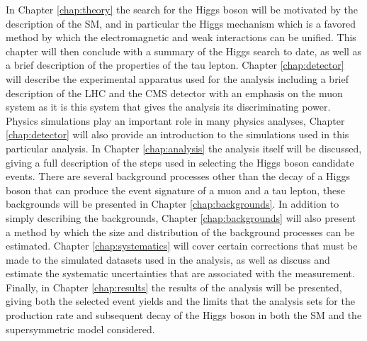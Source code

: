 In Chapter \ref{chap:theory} the search for the Higgs boson will be motivated by the description of the SM, and in particular the Higgs mechanism which is a favored method by which the electromagnetic and weak interactions can be unified.
This chapter will then conclude with a summary of the Higgs search to date, as well as a brief description of the properties of the tau lepton.
Chapter \ref{chap:detector} will describe the experimental apparatus used for the analysis including a brief description of the LHC and the CMS detector with an emphasis on the muon system as it is this system that gives the analysis its discriminating power.
Physics simulations play an important role in many physics analyses, Chapter \ref{chap:detector} will also provide an introduction to the simulations used in this particular analysis.
In Chapter \ref{chap:analysis} the analysis itself will be discussed, giving a full description of the steps used in selecting the Higgs boson candidate events.
There are several background processes other than the decay of a Higgs boson that can produce the event signature of a muon and a tau lepton, these backgrounds will be presented in Chapter \ref{chap:backgrounds}.
In addition to simply describing the backgrounds, Chapter \ref{chap:backgrounds} will also present a method by which the size and distribution of the background processes can be estimated.
Chapter \ref{chap:systematics} will cover certain corrections that must be made to the simulated datasets used in the analysis, as well as discuss and estimate the systematic uncertainties that are associated with the measurement.
Finally, in Chapter \ref{chap:results} the results of the analysis will be presented, giving both the selected event yields and the limits that the analysis sets for the production rate and subsequent decay of the Higgs boson in both the SM and the supersymmetric model considered.
